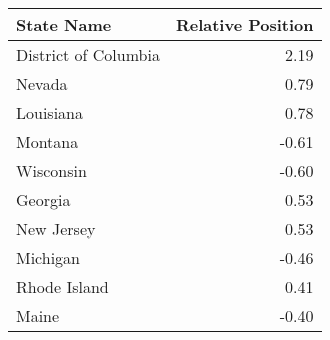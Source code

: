 \begin{tabular}{lr}
\toprule
           State Name &  Relative Position \\
\midrule
 District of Columbia &               2.19 \\
               Nevada &               0.79 \\
            Louisiana &               0.78 \\
              Montana &              -0.61 \\
            Wisconsin &              -0.60 \\
              Georgia &               0.53 \\
           New Jersey &               0.53 \\
             Michigan &              -0.46 \\
         Rhode Island &               0.41 \\
                Maine &              -0.40 \\
\bottomrule
\end{tabular}
